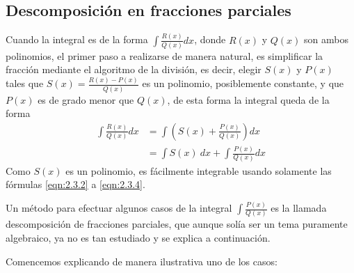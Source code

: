\subsection{Descomposición en fracciones parciales}
Cuando la integral es de la forma $\int \frac{R(x)}{Q(x)}dx$, donde $R(x)$ y $Q(x)$ son ambos polinomios, el primer paso a realizarse de manera natural, es simplificar la fracción mediante el algoritmo de la división, es decir, elegir $S(x)$ y $P(x)$ tales que $S(x)=\frac{R(x)-P(x)}{Q(x)}$ es un polinomio, posiblemente constante, y que $P(x)$ es de grado menor que $Q(x)$, de esta forma la integral queda de la forma
\begin{align*}
	\int \frac{R(x)}{Q(x)}dx&=\int \left(S(x)+\frac{P(x)}{Q(x)}\right)dx\\
						&=\int S(x)\:dx+\int\frac{P(x)}{Q(x)}dx
\end{align*}
Como $S(x)$ es un polinomio, es fácilmente integrable usando solamente las fórmulas \ref{eqn:2.3.2} a \ref{eqn:2.3.4}.

Un método para efectuar algunos casos de la integral $\int \frac{P(x)}{Q(x)}$ es la llamada descomposición de fracciones parciales, que aunque solía ser un tema puramente algebraico, ya no es tan estudiado y se explica a continuación.

Comencemos explicando de manera ilustrativa uno de los casos:

